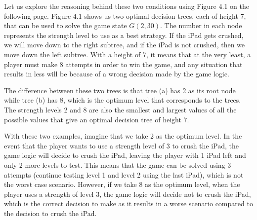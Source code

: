 \documentclass[12pt,a4paper,oneside]{report}
\begin{document}
Let us explore the reasoning behind these two conditions using Figure 4.1 on the following page. Figure 4.1 shows us two optimal decision trees, each of height 7, that can be used to solve the game state $G(2,30)$. The number in each node represents the strength level to use as a best strategy. If the iPad gets crushed, we will move down to the right subtree, and if the iPad is not crushed, then we move down the left subtree. With a height of 7, it means that at the very least, a player must make 8 attempts in order to win the game, and any situation that results in less will be because of a wrong decision made by the game logic.

The difference between these two trees is that tree (a) has 2 as its root node while tree (b) has 8, which is the optimum level that corresponds to the trees. The strength levels 2 and 8 are also the smallest and largest values of all the possible values that give an optimal decision tree of height 7. 

With these two examples, imagine that we take 2 as the optimum level. In the event that the player wants to use a strength level of 3 to crush the iPad, the game logic will decide to crush the iPad, leaving the player with 1 iPad left and only 2 more levels to test. This means that the game can be solved using 3 attempts (continue testing level 1 and level 2 using the last iPad), which is not the worst case scenario. However, if we take 8 as the optimum level, when the player uses a strength of level 3, the game logic will decide not to crush the iPad, which is the correct decision to make as it results in a worse scenario compared to the decision to crush the iPad. 
\end{document}
